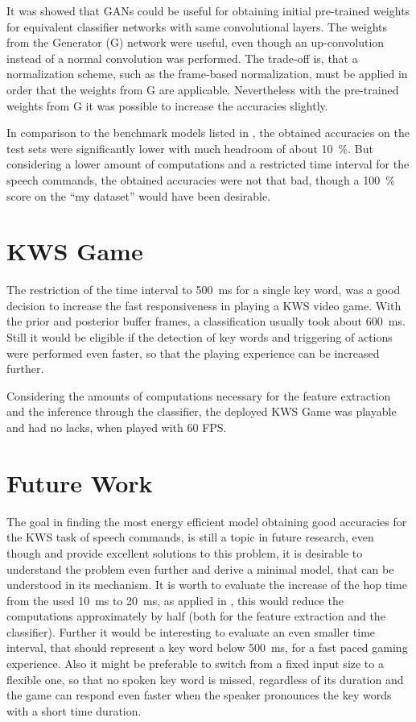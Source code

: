It was showed that GANs could be useful for obtaining initial pre-trained weights for equivalent classifier networks with same convolutional layers.
The weights from the Generator (G) network were useful, even though an up-convolution instead of a normal convolution was performed.
The trade-off is, that a normalization scheme, such as the frame-based normalization, must be applied in order that the weights from G are applicable.
Nevertheless with the pre-trained weights from G it was possible to increase the accuracies slightly.

In comparison to the benchmark models listed in , the obtained accuracies on the test sets were significantly lower with much headroom of about \SI{10}{\percent}.
But considering a lower amount of computations and a restricted time interval for the speech commands, the obtained accuracies were not that bad, though a \SI{100}{\percent} score on the \enquote{my dataset} would have been desirable.



\section{KWS Game}
\thesisStateReady
The restriction of the time interval to \SI{500}{\milli\second} for a single key word, was a good decision to increase the fast responsiveness in playing a KWS video game.
With the prior and posterior buffer frames, a classification usually took about \SI{600}{\milli\second}.
Still it would be eligible if the detection of key words and triggering of actions were performed even faster, so that the playing experience can be increased further.

Considering the amounts of computations necessary for the feature extraction and the inference through the classifier, the deployed KWS Game was playable and had no lacks, when played with 60 FPS.



\section{Future Work}
\thesisStateReady
The goal in finding the most energy efficient model obtaining good accuracies for the KWS task of speech commands, is still a topic in future research, even though \cite{Zhang2017} and \cite{Peter2020} provide excellent solutions to this problem, it is desirable to understand the problem even further and derive a minimal model, that can be understood in its mechanism.
It is worth to evaluate the increase of the hop time from the used \SI{10}{\milli\second} to \SI{20}{\milli\second}, as applied in \cite{Peter2020}, this would reduce the computations approximately by half (both for the feature extraction and the classifier).
Further it would be interesting to evaluate an even smaller time interval, that should represent a key word below \SI{500}{\milli\second}, for a fast paced gaming experience.
Also it might be preferable to switch from a fixed input size to a flexible one, so that no spoken key word is missed, regardless of its duration and the game can respond even faster when the speaker pronounces the key words with a short time duration.

